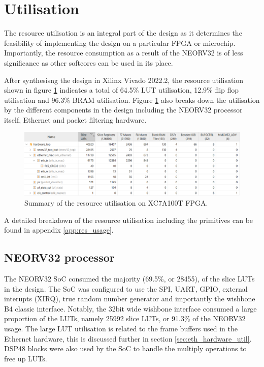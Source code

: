 \section{Utilisation}

The resource utilisation is an integral part of the design as it determines the feasibility of implementing the design on a particular FPGA or microchip. Importantly, the resource consumption as a result of the NEORV32 is of less significance as other softcores can be used in its place.

After synthesisng the design in Xilinx Vivado 2022.2, the resource utilisation shown in figure \ref{fig:resource_util} indicates a total of 64.5\% LUT utilisation, 12.9\% flip flop utilisation and 96.3\% BRAM utilisation. Figure \ref{fig:resource_util} also breaks down the utilisation by the different components in the design including the NEORV32 processor itself, Ethernet and packet filtering hardware.

\begin{figure}[h]
    \centering
    \includegraphics[width=1\textwidth]{Images/FPGAUtilisationResources.png}
    \caption[Summary of the resource utilisation on XC7A100T FPGA]{Summary of the resource utilisation on XC7A100T FPGA.}
    \label{fig:resource_util}
\end{figure}

A detailed breakdown of the resource utilisation including the primitives can be found in appendix \ref{app:res_usage}. 







\subsection{NEORV32 processor}

The NEORV32 SoC consumed the majority (69.5\%, or 28455), of the slice LUTs in the design. The SoC was configured to use the SPI, UART, GPIO, external interupts (XIRQ), true random number generator and importantly the wishbone B4 classic interface. Notably, the 32bit wide wishbone interface consumed a large proportion of the LUTs, namely 25992 slice LUTs, or 91.3\% of the NEORV32 usage. The large LUT utilisation is related to the frame buffers used in the Ethernet hardware, this is discussed further in section \ref{sec:eth_hardware_util}. DSP48 blocks were also used by the SoC to handle the multiply operations to free up LUTs. 

